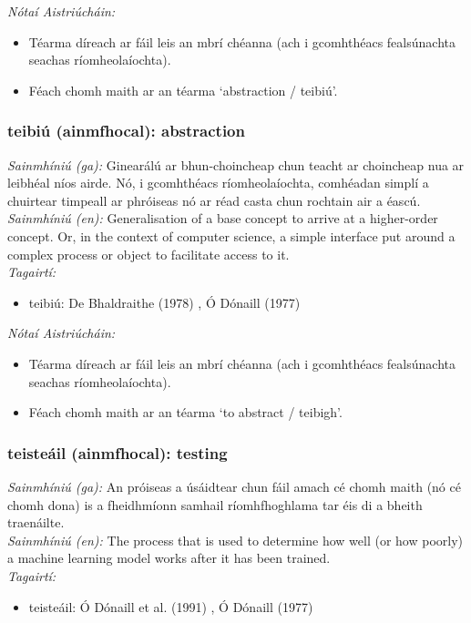  \noindent \textit{Nótaí Aistriúcháin:}
\begin{itemize}
	\item Téarma díreach ar fáil leis an mbrí chéanna (ach i gcomhthéacs fealsúnachta seachas ríomheolaíochta).
	\item Féach chomh maith ar an téarma `abstraction / teibiú'.
\end{itemize}


\subsubsection*{teibiú (ainmfhocal): abstraction}
 \noindent \textit{Sainmhíniú (ga):} Ginearálú ar bhun-choincheap chun teacht ar choincheap nua ar leibhéal níos airde. Nó, i gcomhthéacs ríomheolaíochta, comhéadan simplí a chuirtear timpeall ar phróiseas nó ar réad casta chun rochtain air a éascú.
\\
 \noindent \textit{Sainmhíniú (en):} Generalisation of a base concept to arrive at a higher-order concept. Or, in the context of computer science, a simple interface put around a complex process or object to facilitate access to it.
\\
 \noindent \textit{Tagairtí:}
\begin{itemize}
	\item teibiú: De Bhaldraithe (1978) \cite{de-bhaldraithe}, Ó Dónaill (1977) \cite{odonaill}
\end{itemize}

 \noindent \textit{Nótaí Aistriúcháin:}
\begin{itemize}
	\item Téarma díreach ar fáil leis an mbrí chéanna (ach i gcomhthéacs fealsúnachta seachas ríomheolaíochta).
	\item Féach chomh maith ar an téarma `to abstract / teibigh'.
\end{itemize}


\subsubsection*{teisteáil (ainmfhocal): testing}
 \noindent \textit{Sainmhíniú (ga):} An próiseas a úsáidtear chun fáil amach cé chomh maith (nó cé chomh dona) is a fheidhmíonn samhail ríomhfhoghlama tar éis di a bheith traenáilte.
\\
 \noindent \textit{Sainmhíniú (en):} The process that is used to determine how well (or how poorly) a machine learning model works after it has been trained.
\\
 \noindent \textit{Tagairtí:}
\begin{itemize}
	\item teisteáil: Ó Dónaill et al. (1991) \cite{focloir-beag}, Ó Dónaill (1977) \cite{odonaill}
\end{itemize}

